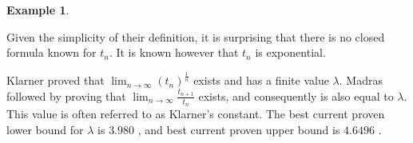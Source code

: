 \documentclass[12pt]{article}
\theoremstyle{plain}
\theoremstyle{definition}
\theoremstyle{remark}
\theoremstyle{definition}
\newtheorem{exmp}{Example}[section]
\newcommand{\cellred}[4]{\filldraw[red!60] ( #1 , #2 ) rectangle ( #3 , #4 ); \draw[thick] ( #1 , #2 ) rectangle ( #3 , #4 );}
\newcommand{\cellgreen}[4]{\filldraw[green!60] ( #1 , #2 ) rectangle ( #3 , #4 ); \draw[thick] ( #1 , #2 ) rectangle ( #3 , #4 );}
\newcommand{\cellpurple}[4]{\filldraw[purple!80] ( #1 , #2 ) rectangle ( #3 , #4 ); \draw[thick] ( #1 , #2 ) rectangle ( #3 , #4 );}
\begin{document}
\begin{exmp}
\begin{center}
\end{center}
\begin{center}
    \label{fig:tetris pieces}
\end{center}
\end{exmp}

Given the simplicity of their definition, it is surprising that there is no closed formula known for $t_n$. It is known however that $t_n$ is exponential.

Klarner \cite{klarner_1967} proved that $\lim_{n \to \infty}(t_n)^{\frac{1}{n}}$ exists and has a finite value $\lambda$. Madras \cite{Madras1999APT} followed by proving that $\lim_{n \to \infty} \frac{t_{n+1}}{t_n}$ exists, and consequently is also equal to $\lambda$. This value is often referred to as Klarner's constant. The best current proven lower bound for $\lambda$ is $3.980$ \cite{Barequet2004} , and best current proven upper bound is $4.6496$ \cite{klarner_rivest_1973}.
\end{document}
